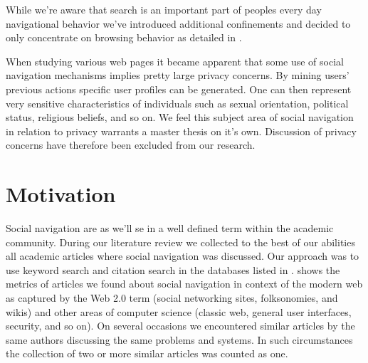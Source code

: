 While we're aware that search is an important part of peoples every day
navigational behavior we've introduced additional confinements and decided to
only concentrate on browsing behavior as detailed in
.

When studying various web pages it became apparent that some use of
social navigation mechanisms implies pretty large privacy concerns. By mining
users' previous actions specific user profiles can be generated. One can then
represent very sensitive characteristics of individuals such as sexual
orientation, political status, religious beliefs, and so on.
We feel this subject area of social navigation in relation to privacy warrants
a master thesis on it's own. Discussion of privacy concerns have therefore
been excluded from our research.

\section{Motivation}


Social navigation are as we'll se in
a well defined term within the academic community.
During our literature review we collected to the best of our abilities all
academic articles where social navigation was discussed. Our approach was to
use keyword search and citation search in the databases listed in
.%
 shows the metrics of articles
we found about social navigation in context of the modern web as captured by
the Web 2.0 term (social networking sites, folksonomies, and wikis) and other
areas of computer science (classic web, general user interfaces, security, and
so on).
On several occasions we encountered similar articles by the same authors
discussing the same problems and systems. In such circumstances the collection
of two or more similar articles was counted as one.

